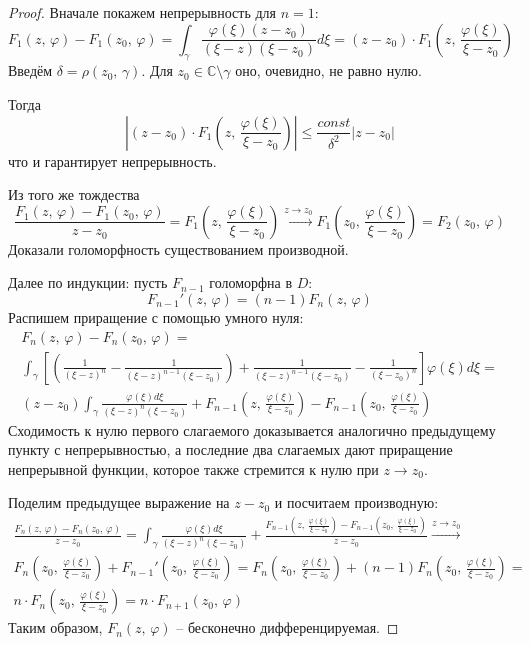 \documentclass[a4paper,12pt]{article}
\renewcommand{\phi}{\ensuremath{\varphi}}
\renewcommand{\leq}{\ensuremath{\leqslant}}
\theoremstyle{plain}
\theoremstyle{definition}
\theoremstyle{remark}
\begin{document}
\begin{proof}
	Вначале покажем непрерывность для $n = 1$:
	\[
		F_1(z,\, \phi) - F_1(z_0,\, \phi) = \int_\gamma\frac{\phi(\xi)(z - z_0)}{(\xi - z)(\xi - z_0)}d\xi = (z - z_0)\cdot F_1\left(z,\, \frac{\phi(\xi)}{\xi - z_0}\right)
	\]
	Введём $\delta = \rho(z_0,\, \gamma)$. Для $z_0 \in \mathbb{C}\setminus \gamma$ оно, очевидно, не равно нулю.

	Тогда
	\[
		\left\vert (z - z_0)\cdot F_1\left(z,\, \frac{\phi(\xi)}{\xi - z_0}\right)\right\vert \leq \frac{const}{\delta^2}\vert z - z_0\vert
	\]
	что и гарантирует непрерывность.

	Из того же тождества
	\[
		\frac{F_1(z,\, \phi) - F_1(z_0,\, \phi)}{z - z_0} = F_1\left(z,\, \frac{\phi(\xi)}{\xi - z_0}\right) \overset{z \to z_0}{\to} F_1\left(z_0,\, \frac{\phi(\xi)}{\xi - z_0}\right) = F_2(z_0,\, \phi)
	\]
	Доказали голоморфность существованием производной.

	Далее по индукции: пусть $F_{n - 1}$ голоморфна в $D$:
	\[
		F_{n - 1}'(z,\, \phi) = (n - 1)F_n(z,\, \phi)
	\]
	Распишем приращение с помощью умного нуля:
	\begin{align*}
		F_n(z,\, \phi) - F_n(z_0,\, \phi) =                                                                                                                                                   \\
		\int_\gamma\left[\left(\frac{1}{(\xi - z)^n} - \frac{1}{(\xi - z)^{n - 1}(\xi - z_0)}\right) + \frac{1}{(\xi - z)^{n - 1}(\xi - z_0)} - \frac{1}{(\xi - z_0)^n}\right]\phi(\xi)d\xi = \\
		(z - z_0)\int_\gamma\frac{\phi(\xi)d\xi}{(\xi - z)^n(\xi - z_0)} + F_{n - 1}\left(z,\, \frac{\phi(\xi)}{\xi - z_0}\right) - F_{n-1}\left(z_0,\, \frac{\phi(\xi)}{\xi - z_0}\right)
	\end{align*}
	Сходимость к нулю первого слагаемого доказывается аналогично предыдущему пункту с непрерывностью, а последние два слагаемых дают приращение непрерывной функции, которое также стремится к нулю при $z \to z_0$.

	Поделим предыдущее выражение на $z - z_0$ и посчитаем производную:
	\begin{align*}
		\frac{F_n(z,\, \phi) - F_n(z_0,\, \phi)}{z - z_0} = \int_\gamma\frac{\phi(\xi)d\xi}{(\xi - z)^n(\xi - z_0)} + \frac{F_{n - 1}\left(z,\, \frac{\phi(\xi)}{\xi - z_0}\right) - F_{n-1}\left(z_0,\, \frac{\phi(\xi)}{\xi - z_0}\right)}{z - z_0} \overset{z \to z_0}{\to} \\
		F_n\left(z_0,\, \frac{\phi(\xi)}{\xi - z_0}\right) + F_{n - 1}'\left(z_0,\, \frac{\phi(\xi)}{\xi - z_0}\right) = F_n\left(z_0,\, \frac{\phi(\xi)}{\xi - z_0}\right) + (n-1)F_n\left(z_0,\, \frac{\phi(\xi)}{\xi - z_0}\right) =                                        \\
		n\cdot F_n\left(z_0,\, \frac{\phi(\xi)}{\xi - z_0}\right) = n\cdot F_{n + 1}(z_0,\, \phi)
	\end{align*}
	Таким образом, $F_n(z,\, \phi)$ -- бесконечно дифференцируемая.
\end{proof}
\end{document}
